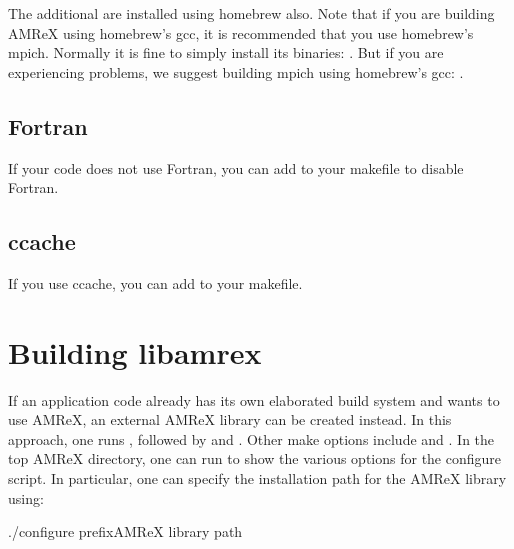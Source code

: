 \documentclass[letterpaper,10pt,english]{sphinxmanual}
\begin{document}
\sphinxAtStartPar
The additional  are installed using homebrew also. Note
that if you are building AMReX using homebrew’s gcc, it is recommended that you
use homebrew’s mpich. Normally it is fine to simply install its binaries:
. But if you are experiencing problems, we suggest
building mpich using homebrew’s gcc: .


\subsection{Fortran}
\label{\detokenize{BuildingAMReX:fortran}}
\sphinxAtStartPar
If your code does not use Fortran, you can add  to
your makefile to disable Fortran.


\subsection{ccache}
\label{\detokenize{BuildingAMReX:ccache}}
\sphinxAtStartPar
If you use ccache, you can add  to your makefile.


\section{Building libamrex}
\label{\detokenize{BuildingAMReX:building-libamrex}}\label{\detokenize{BuildingAMReX:sec-build-lib}}
\sphinxAtStartPar
If an application code already has its own elaborated build system and wants to
use AMReX, an external AMReX library can be created instead. In this approach, one
runs , followed by  and .
Other make options include  and .  In the top
AMReX directory, one can run  to show the various options for
the configure script. In particular, one can specify the installation path for the AMReX library using:

\begin{sphinxVerbatim}[commandchars=\\\{\}]
./configure \PYGZhy{}\PYGZhy{}prefix\PYG{o}{[}AMReX library path\PYG{o}{]}
\end{sphinxVerbatim}
\end{document}
